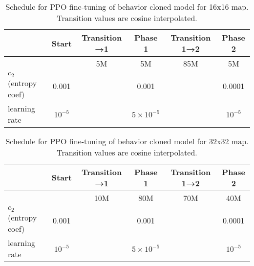 \documentclass[conference,onecolumn]{IEEEtran}
\newcounter{supptable}
\newenvironment{supptable}
  {\renewcommand{\tablename}{Supplemental Table}\setcounter{table}{\value{supptable}}\addtocounter{supptable}{1}\begin{table}}
  {\end{table}\setcounter{supptable}{\value{table}}}
\begin{document}
\begin{supptable}[H]
    \caption{Schedule for PPO fine-tuning of behavior cloned model for 16x16 map. Transition values are cosine interpolated.}
    \label{tab:bc-ppo-schedule-map16}
    \begin{center}
    \begin{tabular}{lccccc}
    & Start & Transition →1 & Phase 1 & Transition 1→2 & Phase 2 \\
    \midrule
    &  & 5M & 5M & 85M & 5M \\
    $c_2$ (entropy coef) & 0.001 &  & 0.001 &  & 0.0001 \\
    learning rate & $10^{-5}$ &  & $5 \times 10^{-5}$ &  & $10^{-5}$ \\
    \end{tabular}
\end{center}
\end{supptable}

\begin{supptable}[H]
    \caption{Schedule for PPO fine-tuning of behavior cloned model for 32x32 map. Transition values are cosine interpolated.}
    \label{tab:bc-ppo-schedule-map32}
    \begin{center}
    \begin{tabular}{lccccc}
    & Start & Transition →1 & Phase 1 & Transition 1→2 & Phase 2 \\
    \midrule
    &  & 10M & 80M & 70M & 40M \\
    $c_2$ (entropy coef) & 0.001 &  & 0.001 &  & 0.0001 \\
    learning rate & $10^{-5}$ &  & $5 \times 10^{-5}$ &  & $10^{-5}$ \\
    \end{tabular}
\end{center}
\end{supptable}
\end{document}
